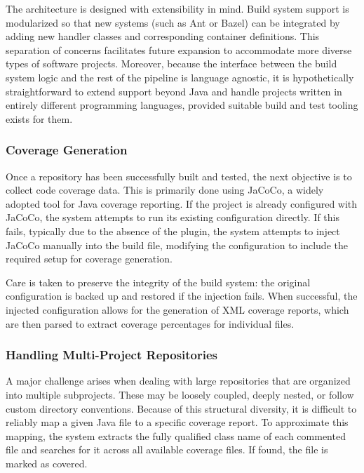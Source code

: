 The architecture is designed with extensibility in mind. Build system support is modularized so that
new systems (such as Ant or Bazel) can be integrated by adding new handler classes and corresponding
container definitions. This separation of concerns facilitates future expansion to accommodate more
diverse types of software projects. Moreover, because the interface between the build system logic
and the rest of the pipeline is language agnostic, it is hypothetically straightforward to extend
support beyond Java and handle projects written in entirely different programming languages,
provided suitable build and test tooling exists for them.

\subsubsection{Coverage Generation}

Once a repository has been successfully built and tested, the next objective is to collect code
coverage data. This is primarily done using JaCoCo, a widely adopted tool for Java coverage
reporting. If the project is already configured with JaCoCo, the system attempts to run its existing
configuration directly. If this fails, typically due to the absence of the plugin, the system attempts
to inject JaCoCo manually into the build file, modifying the configuration to include the required
setup for coverage generation.

Care is taken to preserve the integrity of the build system: the original configuration is backed up
and restored if the injection fails. When successful, the injected configuration allows for the
generation of XML coverage reports, which are then parsed to extract coverage percentages for
individual files.

\subsubsection{Handling Multi-Project Repositories}

\label{sec:multi-project-repo}
A major challenge arises when dealing with large repositories that are organized into multiple
subprojects. These may be loosely coupled, deeply nested, or follow custom directory conventions.
Because of this structural diversity, it is difficult to reliably map a given Java file to a
specific coverage report. To approximate this mapping, the system extracts the fully qualified class
name of each commented file and searches for it across all available coverage files. If found, the
file is marked as covered.

